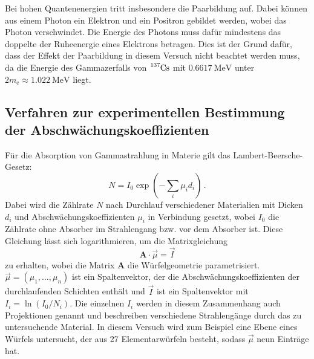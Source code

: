 Bei hohen Quantenenergien tritt insbesondere die Paarbildung auf. Dabei können aus
einem Photon ein Elektron und ein Positron gebildet werden, wobei das
Photon verschwindet. Die Energie des Photons muss dafür mindestens das doppelte
der Ruheenergie eines Elektrons betragen. Dies ist der Grund dafür, dass der Effekt der Paarbildung in diesem Versuch nicht beachtet werden muss, da die Energie des Gammazerfalls von $\ce{^{137}Cs}$ mit $\SI{0.6617}{\mega\electronvolt}$ unter $2m_\text{e} \approx \SI{1.022}{\mega\electronvolt}$ liegt.

%

\subsection{Verfahren zur experimentellen Bestimmung der Abschwächungskoeffizienten}

Für die Absorption von Gammastrahlung in Materie gilt das Lambert-Beersche-Gesetz:
\begin{equation}
	N = I_0 \exp\left(-\sum_i \mu_i d_i\right)\,.
	\label{eqn:lambertBeer}
\end{equation}
Dabei wird die Zählrate $N$ nach Durchlauf verschiedener Materialien mit Dicken $d_i$ und Abschwächungskoeffizienten $\mu_i$ in Verbindung gesetzt, wobei $I_0$ die Zählrate ohne Absorber im Strahlengang bzw. vor dem Absorber ist.
Diese Gleichung lässt sich logarithmieren, um die Matrixgleichung
\begin{equation}
	\symbf{A} \cdot \vec{\mu} = \vec{I}
\end{equation}
zu erhalten, wobei die Matrix $\symbf{A}$ die Würfelgeometrie parametrisiert. $\vec{\mu} = (\mu_1, \dots, \mu_n)$ ist ein Spaltenvektor, der die Abschwächungskoeffizienten der durchlaufenden Schichten enthält und $\vec{I}$ ist ein Spaltenvektor mit $I_i = \ln(I_0/N_i)$. Die einzelnen $I_i$ werden in diesem Zusammenhang auch Projektionen genannt und beschreiben verschiedene Strahlengänge durch das zu untersuchende Material. In diesem Versuch wird zum Beispiel eine Ebene eines Würfels untersucht, der aus 27 Elementarwürfeln besteht, sodass $\vec{\mu}$ neun Einträge hat.

